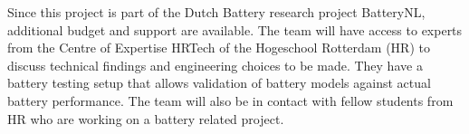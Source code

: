 Since this project is part of the Dutch Battery research project BatteryNL,
additional budget and support are available. The team will have access to experts
from the Centre of Expertise HRTech of the Hogeschool Rotterdam (HR) to
discuss technical findings and engineering choices to be made. They have a
battery testing setup that allows validation of battery models against actual
battery performance. The team will also be in contact with fellow students from
HR who are working on a battery related project.
